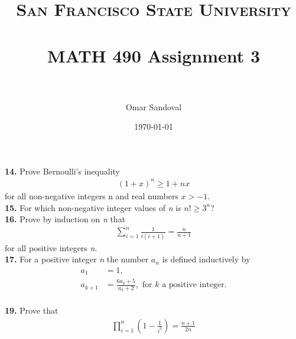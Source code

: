 \documentclass[paper=letter, fontsize=11pt]{scrartcl} %
\title{	
\normalfont \normalsize 
\textsc{San Francisco State University} \\ [25pt]
\horrule{0.5pt} \\[0.4cm] %
\huge MATH 490 Assignment 3  \\ %
\horrule{2pt} \\[0.5cm] %
}
\author{Omar Sandoval}
\date{\normalsize\today}
\begin{document}
\maketitle
\textbf{14.} Prove Bernoulli's inequality
\begin{align*}
	(1+x)^n \ge 1 + nx
\end{align*}
for all non-negative integers n and real numbers $x > -1$. \\

\textbf{15.} For which non-negative integer values of \textit{n} is $n! \ge 3^n$? \\

\textbf{16.} Prove by induction on \textit{n} that
\begin{align*}
	\sum_{i=1}^{n} \frac{1}{i(i+1)} = \frac{n}{n+1}
\end{align*}
for all positive integers \textit{n}. \\

\textbf{17.} For a positive integer \textit{n} the number $a_n$ is defined inductively by
\begin{align*}
	a_1 &= 1, \\
	a_{k+1} &= \frac{6a_k + 5}{a_k + 2}, \text{  for } k \text{ a positive integer.} \\
\end{align*}

\textbf{19.} Prove that 
\begin{align*}
	\prod_{i=1}^n (1 - \frac{1}{i^2}) = \frac{n + 1}{2n}
\end{align*}
\end{document}
